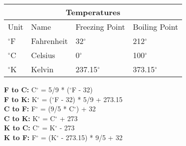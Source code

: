\documentclass[12pt]{article}
\begin{document}
\begin{center}
    \begin{tabular}{ |p{3cm}|p{3cm}|p{3cm}|p{4cm}|  }
        \hline
        \multicolumn{4}{|c|}{Temperatures} \\
        \hline
            Unit & Name & Freezing Point & Boiling Point \\
        \hline
        $^{\circ}$F & Fahrenheit & 32$^{\circ}$ & 212$^{\circ}$ \\
        $^{\circ}$C & Celsius & 0$^{\circ}$ & 100$^{\circ}$ \\
        $^{\circ}$K & Kelvin & 237.15$^{\circ}$ & 373.15$^{\circ}$ \\
        \hline
    \end{tabular}
\end{center} 

\textbf{F to C:} C$^{\circ}$ = 5/9 * ($^{\circ}$F - 32) \\
\textbf{F to K:} K$^{\circ}$ = ($^{\circ}$F - 32) * 5/9 + 273.15\\
\textbf{C to F:} F$^{\circ}$ = (9/5 * C$^{\circ}$) + 32 \\
\textbf{C to K:} K$^{\circ}$ = C$^{\circ}$ + 273 \\
\textbf{K to C:} C$^{\circ}$ = K$^{\circ}$ - 273 \\
\textbf{K to F:} F$^{\circ}$ = (K$^{\circ}$ - 273.15) * 9/5 + 32 \\
\end{document}

